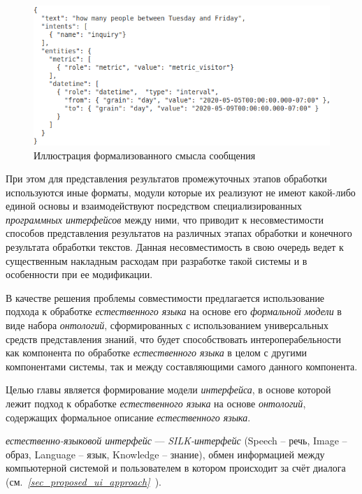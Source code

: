 \begin{figure}[h]
    \centerline{\includegraphics[scale=0.55]{images/part4/chapter_nl_interfaces/message_intents}}
    \caption{Иллюстрация формализованного смысла сообщения}
    \label{fig:message_intents}
\end{figure}

При этом для представления результатов промежуточных этапов обработки используются иные форматы, модули которые их реализуют не имеют какой-либо единой основы и взаимодействуют посредством специализированных \textit{программных интерфейсов} между ними, что приводит к несовместимости способов представления результатов на различных этапах обработки и конечного результата обработки текстов.
Данная несовместимость в свою очередь ведет к существенным накладным расходам при разработке такой системы и в особенности при ее модификации.

В качестве решения проблемы совместимости предлагается использование подхода к обработке \textit{естественного языка} на основе его \textit{формальной модели} в виде набора \textit{онтологий}, сформированных с использованием универсальных средств представления знаний, что будет способствовать интероперабельности как компонента по обработке \textit{естественного языка} в целом с другими компонентами системы, так и между составляющими самого данного компонента.

Целью главы является формирование модели \textit{интерфейса}, в основе которой лежит подход к обработке \textit{естественного языка} на основе \textit{онтологий}, содержащих формальное описание \textit{естественного языка}.

\textit{естественно-языковой интерфейс} --- \textit{SILK-интерфейс} (Speech – речь, Image – образ, Language – язык, Knowledge – знание), обмен информацией между компьютерной системой и пользователем в котором происходит за счёт диалога (см.~\textit{\ref{sec_proposed_ui_approach}~}).

